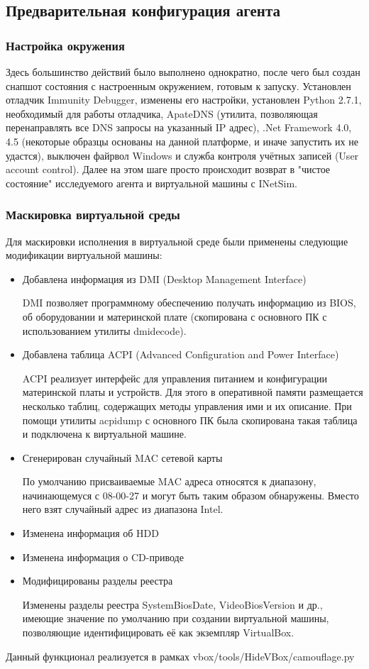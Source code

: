 \subsection {Предварительная конфигурация агента}
\subsubsection {Настройка окружения}
Здесь большинство действий было выполнено однократно, после чего был создан снапшот состояния с настроенным окружением, готовым к запуску. Установлен отладчик Immunity Debugger, изменены его настройки, установлен Python 2.7.1, необходимый для работы отладчика, ApateDNS (утилита, позволяющая перенаправлять все DNS запросы на указанный IP адрес), .Net Framework 4.0, 4.5 (некоторые образцы основаны на данной платформе, и иначе запустить их не удастся), выключен файрвол Windows и служба контроля учётных записей (User account control).
Далее на этом шаге просто происходит возврат в "чистое состояние" исследуемого агента и виртуальной машины с INetSim.
\subsubsection {Маскировка виртуальной среды}
Для маскировки исполнения в виртуальной среде были применены следующие модификации виртуальной машины:
\begin {itemize}
	\item Добавлена информация из DMI (Desktop Management Interface)

	DMI позволяет программному обеспечению получать информацию из BIOS, об оборудовании и материнской плате (скопирована с основного ПК с использованием утилиты dmidecode).
	\item Добавлена таблица ACPI (Advanced Configuration and Power Interface)

	ACPI реализует интерфейс для управления питанием и конфигурации материнской платы и устройств. Для этого в оперативной памяти размещается несколько таблиц, содержащих методы управления ими и их описание. При помощи утилиты acpidump с основного ПК была скопирована такая таблица и подключена к виртуальной машине.
	\item Сгенерирован случайный MAC сетевой карты

	По умолчанию присваиваемые MAC адреса относятся к диапазону, начинающемуся с 08-00-27 и могут быть таким образом обнаружены. Вместо него взят случайный адрес из диапазона Intel.
	\item Изменена информация об HDD
	\item Изменена информация о CD-приводе
	\item Модифицированы разделы реестра

	Изменены разделы реестра SystemBiosDate, VideoBiosVersion и др., имеющие значение по умолчанию при создании виртуальной машины, позволяющие идентифицировать её как экземпляр VirtualBox.
\end {itemize}
Данный функционал реализуется в рамках vbox/tools/HideVBox/camouflage.py

